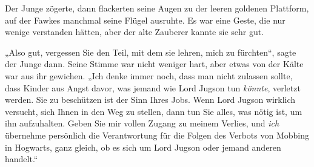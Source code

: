 Der Junge zögerte, dann flackerten seine Augen zu der leeren goldenen Plattform, auf der Fawkes manchmal seine Flügel ausruhte. Es war eine Geste, die nur wenige verstanden hätten, aber der alte Zauberer kannte sie sehr gut.

„Also gut, vergessen Sie den Teil, mit dem sie lehren, mich zu fürchten“, sagte der Junge dann. Seine Stimme war nicht weniger hart, aber etwas von der Kälte war aus ihr gewichen. „Ich denke immer noch, dass man nicht zulassen sollte, dass Kinder aus Angst davor, was jemand wie Lord Jugson tun \emph{könnte}, verletzt werden. Sie zu beschützen ist der Sinn Ihres Jobs. Wenn Lord Jugson wirklich versucht, sich Ihnen in den Weg zu stellen, dann tun Sie alles, was nötig ist, um ihn aufzuhalten. Geben Sie mir vollen Zugang zu meinem Verlies, und \emph{ich} übernehme persönlich die Verantwortung für die Folgen des Verbots von Mobbing in Hogwarts, ganz gleich, ob es sich um Lord Jugson oder jemand anderen handelt.“

